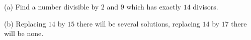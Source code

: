 (a) Find a number divisible by $2$ and $9$ which has exactly $14$ divisors.

(b) Replacing $14$ by $15$ there will be several solutions, replacing $14$ by $17$ there will be none.
